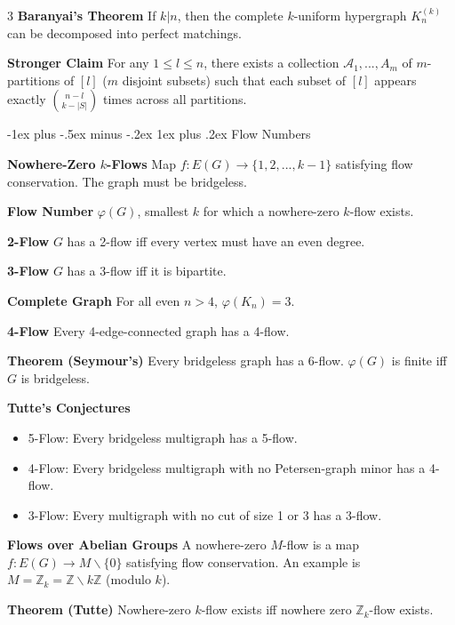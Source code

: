 \documentclass[10pt, landscape]{article}
\makeatletter
\renewcommand{\subsection}{\@startsection{subsection}{3}{0mm}%
                                {-1ex plus -.5ex minus -.2ex}%
                                {1ex plus .2ex}%
                                {\normalfont\small\bfseries}}%
\makeatother
\begin{document}
\begin{multicols*}{3}
\textbf{Baranyai's Theorem} If $k | n$, then the complete $k$-uniform hypergraph $K_n^{(k)}$ can be decomposed into perfect matchings.

\textbf{Stronger Claim} For any $1 \leq l \leq n$, there exists a collection $\mathcal{A}_1, ..., A_m$ of $m$-partitions of $[l]$ ($m$ disjoint subsets) such that each subset of $[l]$ appears exactly ${n - l \choose k - |S|}$ times across all partitions.

\subsection{Flow Numbers}

\textbf{Nowhere-Zero $k$-Flows} Map $f:E(G) \rightarrow \{1,2,...,k-1\}$ satisfying flow conservation. The graph must be bridgeless.

\textbf{Flow Number} $\varphi(G)$, smallest $k$ for which a nowhere-zero $k$-flow exists.

\textbf{2-Flow} $G$ has a 2-flow iff every vertex must have an even degree.

\textbf{3-Flow} $G$ has a 3-flow iff it is bipartite.

\textbf{Complete Graph} For all even $n>4$, $\varphi(K_n)=3$.

\textbf{4-Flow} Every 4-edge-connected graph has a 4-flow.

\textbf{Theorem (Seymour's)} Every bridgeless graph has a 6-flow. $\varphi(G)$ is finite iff $G$ is bridgeless.

\textbf{Tutte's Conjectures}
\begin{itemize}
    \item 5-Flow: Every bridgeless multigraph has a 5-flow.
    \item 4-Flow: Every bridgeless multigraph with no Petersen-graph minor has a 4-flow.
    \item 3-Flow: Every multigraph with no cut of size 1 or 3 has a 3-flow.
\end{itemize}

\textbf{Flows over Abelian Groups} A nowhere-zero $M$-flow is a map $f:E(G) \rightarrow M \backslash\{0\}$ satisfying flow conservation. An example is $M=\mathbb{Z}_k=\mathbb{Z}\backslash k \mathbb{Z}$ (modulo $k$).

\textbf{Theorem (Tutte)} Nowhere-zero $k$-flow exists iff nowhere zero $\mathbb{Z}_k$-flow exists.


\end{multicols*}
\end{document}
